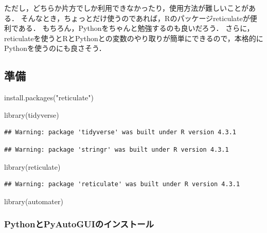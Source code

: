 \documentclass[
]{article}
\newenvironment{Shaded}{\begin{snugshade}}{\end{snugshade}}
\newcommand{\FunctionTok}[1]{\textcolor[rgb]{0.00,0.00,0.00}{#1}}
\newcommand{\NormalTok}[1]{#1}
\newcommand{\StringTok}[1]{\textcolor[rgb]{0.31,0.60,0.02}{#1}}
\begin{document}
ただし，どちらか片方でしか利用できなかったり，使用方法が難しいことがある．
そんなとき，ちょっとだけ使うのであれば，Rのパッケージreticulateが便利である．
もちろん，Pythonをちゃんと勉強するのも良いだろう．
さらに，reticulateを使うとRとPythonとの変数のやり取りが簡単にできるので，本格的にPythonを使うのにも良さそう．

\hypertarget{ux6e96ux5099-7}{%
\subsection{準備}\label{ux6e96ux5099-7}}

\begin{Shaded}
\begin{Highlighting}[]
\FunctionTok{install.packages}\NormalTok{(}\StringTok{"reticulate"}\NormalTok{)}
\end{Highlighting}
\end{Shaded}

\begin{Shaded}
\begin{Highlighting}[]
\FunctionTok{library}\NormalTok{(tidyverse)}
\end{Highlighting}
\end{Shaded}

\begin{verbatim}
## Warning: package 'tidyverse' was built under R version 4.3.1
\end{verbatim}

\begin{verbatim}
## Warning: package 'stringr' was built under R version 4.3.1
\end{verbatim}

\begin{Shaded}
\begin{Highlighting}[]
\FunctionTok{library}\NormalTok{(reticulate)}
\end{Highlighting}
\end{Shaded}

\begin{verbatim}
## Warning: package 'reticulate' was built under R version 4.3.1
\end{verbatim}

\begin{Shaded}
\begin{Highlighting}[]
\FunctionTok{library}\NormalTok{(automater)}
\end{Highlighting}
\end{Shaded}

\hypertarget{pythonux3068pyautoguiux306eux30a4ux30f3ux30b9ux30c8ux30fcux30eb}{%
\subsubsection{PythonとPyAutoGUIのインストール}\label{pythonux3068pyautoguiux306eux30a4ux30f3ux30b9ux30c8ux30fcux30eb}}
\end{document}
